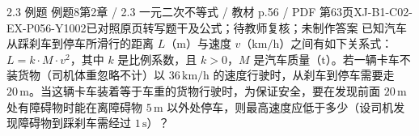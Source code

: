 \par\noindent\begin{minipage}{\linewidth}
\begin{bankitem}{2.3 例题 例题8}{第2章 / 2.3 一元二次不等式 / 教材 p.56 / PDF 第63页}{XJ-B1-C02-EX-P056-Y1002}{已对照原页转写题干及公式；待教师复核；未制作答案}
已知汽车从踩刹车到停车所滑行的距离 $L$（$\mathrm m$）与速度 $v$（$\mathrm{km/h}$）之间有如下关系式：$L=k\cdot M\cdot v^2$，其中 $k$ 是比例系数，且 $k>0$，$M$ 是汽车质量（$\mathrm t$）。若一辆卡车不装货物（司机体重忽略不计）以 $36\,\mathrm{km/h}$ 的速度行驶时，从刹车到停车需要走 $20\,\mathrm m$。当这辆卡车装着等于车重的货物行驶时，为保证安全，要在发现前面 $20\,\mathrm m$ 处有障碍物时能在离障碍物 $5\,\mathrm m$ 以外处停车，则最高速度应低于多少（设司机发现障碍物到踩刹车需经过 $1\,\mathrm s$）？
\end{bankitem}
\end{minipage}\par\medskip

